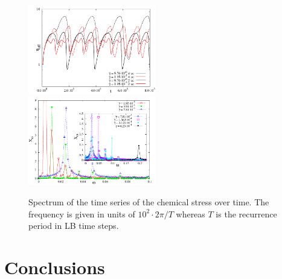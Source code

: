 \documentclass[aps,pre,reprint,superscriptaddress]{revtex4}
\begin{document}
\begin{figure}[h]
\includegraphics[width=0.495\textwidth]{stress_bp1_2uc_4uc.pdf}
\includegraphics[width=0.495\textwidth]{spectrum_bp1.pdf}
\caption{Spectrum of the time series of the chemical stress over time. The frequency is given in units of $10^2\cdot 2\pi/T$ whereas $T$ is the recurrence period in LB time steps.}
\label{bp1-spec}
\end{figure}


\clearpage

\section{Conclusions}


%
\end{document}
